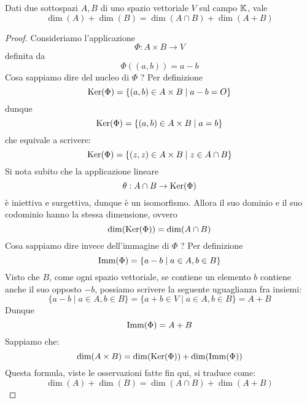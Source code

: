 \begin{theorem}[Grassmann]
	Dati due sottospazi $A, B$ di uno spazio vettoriale $V$ sul campo
	$\mathbb{K}$, vale
	\[
		\dim(A) + \dim(B) = \dim(A \cap B) + \dim(A + B)
	\]
	\begin{proof}
		Consideriamo l'applicazione
		\[
			\Phi : A \times B \to V
		\]
		definita da
		\[ \Phi((a, b)) = a - b \]
		Cosa sappiamo dire del nucleo di $\Phi$ ? Per definizione
		\[
			\operatorname{Ker}(\Phi) = \{(a, b) \in A \times B \mid a - b = O\}
		\]
		dunque
		\[
			\operatorname{Ker}(\Phi) = \{(a, b) \in A \times B \mid a = b\}
		\]
		che equivale a scrivere:
		\[
			\operatorname{Ker}(\Phi) = \{(z, z) \in A \times B \mid z \in A \cap B\}
		\]
		Si nota subito che la applicazione lineare
		\[ \theta : A \cap B \to \operatorname{Ker}(\Phi) \]
		è iniettiva e surgettiva, dunque è un isomorfismo. Allora il suo dominio e
		il suo codominio hanno la stessa dimensione, ovvero
		\[
			\dim(\operatorname{Ker}(\Phi)) = \dim(A \cap B)
		\]
		Cosa sappiamo dire invece dell'immagine di $\Phi$ ? Per definizione
		\[
			\operatorname{Imm}(\Phi) = \{a - b \mid a \in A, b \in B\}
		\]
		Visto che $B$, come ogni spazio vettoriale, se contiene un elemento
		$b$ contiene anche il suo opposto $-b$, possiamo scrivere la seguente
		uguaglianza fra insiemi:
		\[
			\{ a - b \mid a \in A, b \in B \} =
			\{ a + b \in V \mid a \in A, b \in B \} =
			A + B
		\]
		Dunque
		\[
			\operatorname{Imm}(\Phi) = A + B
		\]
		Sappiamo che:
		\[
			\dim(A \times B) = \dim(\operatorname{Ker}(\Phi)) + \dim(\operatorname{Imm}(\Phi))
		\]
		Questa formula, viste le osservazioni fatte fin qui, si traduce come:
		\[
			\dim(A) + \dim(B) = \dim(A \cap B) + \dim(A + B)
		\]
	\end{proof}
\end{theorem}
